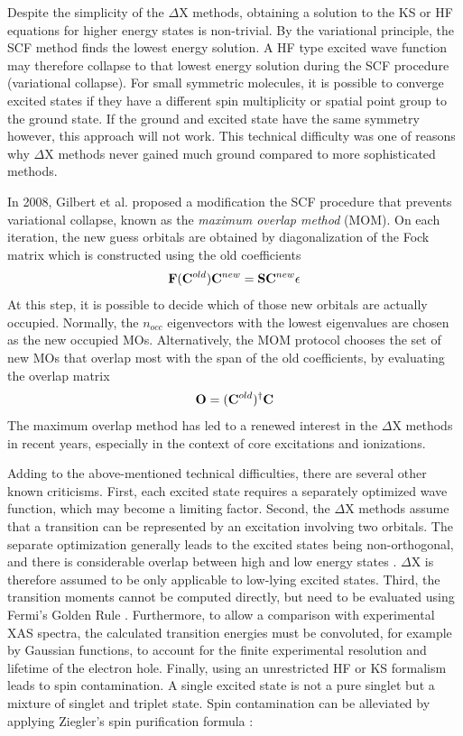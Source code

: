 Despite the simplicity of the $\Delta$X methods, obtaining a solution to the KS or HF equations for higher energy states is non-trivial. By the variational principle, the SCF method finds the lowest energy solution. A HF type excited wave function may therefore collapse to that lowest energy solution during the SCF procedure (variational collapse). For small symmetric molecules, it is possible to converge excited states if they have a different spin multiplicity or spatial point group to the ground state. If the ground and excited state have the same symmetry however, this approach will not work. This technical difficulty was one of reasons why $\Delta$X methods never gained much ground compared to more sophisticated methods.

In 2008, Gilbert et al. \cite{Gil2008} proposed a modification the SCF procedure that prevents variational collapse, known as the \emph{maximum overlap method} (MOM). On each iteration, the new guess orbitals are obtained by diagonalization of the Fock matrix which is constructed using the old coefficients
\begin{equation}
\mathbf{F}(\mathbf{C}^{old})\mathbf{C}^{new} = \mathbf{S}\mathbf{C}^{new}\epsilon
\end{equation}
\noindent At this step, it is possible to decide which of those new orbitals are actually occupied. Normally, the $n_{occ}$ eigenvectors with the lowest eigenvalues are chosen as the new occupied MOs. Alternatively, the MOM protocol chooses the set of new MOs that overlap most with the span of the old coefficients, by evaluating the overlap matrix
\begin{equation}
\mathbf{O} = (\mathbf{C}^{old})^{\dagger} \mathbf{C}
\end{equation}
\noindent The maximum overlap method has led to a renewed interest in the $\Delta$X methods in recent years, especially in the context of core excitations and ionizations. 

Adding to the above-mentioned technical difficulties, there are several other known criticisms. First, each excited state requires a separately optimized wave function, which may become a limiting factor. Second, the $\Delta$X methods assume that a transition can be represented by an excitation involving two orbitals. The separate optimization generally leads to the excited states being non-orthogonal, and there is considerable overlap between high and low energy states \cite{Dav1964,Dav1965,Gil2008}. $\Delta$X is therefore assumed to be only applicable to low-lying excited states. Third, the transition moments cannot be computed directly, but need to be evaluated using Fermi's Golden Rule \cite{Gro2008}. Furthermore, to allow a comparison with experimental XAS spectra, the calculated transition energies must be convoluted, for example by Gaussian functions, to 
account for the finite experimental resolution and  lifetime of the electron hole. Finally, using an unrestricted HF or KS formalism leads to spin contamination. A single excited state is not a pure singlet but a mixture of singlet and triplet state. Spin contamination can be alleviated by applying Ziegler's spin purification formula \cite{Zie1977}:

